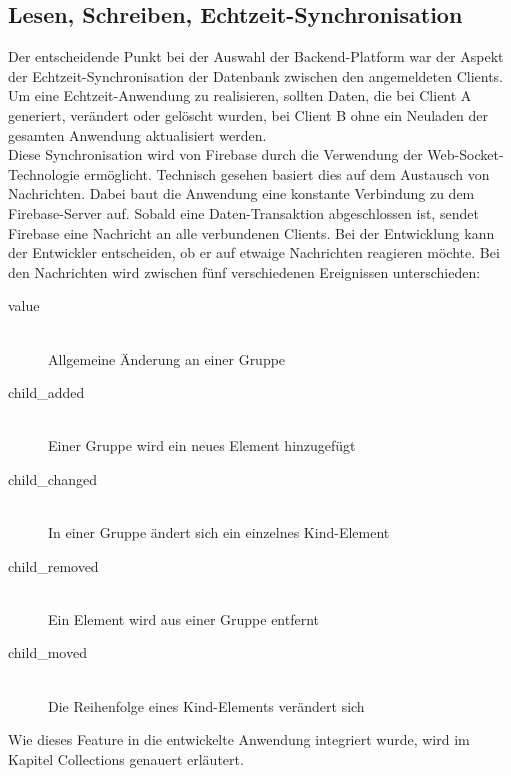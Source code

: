 \subsection{Lesen, Schreiben, Echtzeit-Synchronisation}
Der entscheidende Punkt bei der Auswahl der Backend-Platform war der Aspekt der Echtzeit-Synchronisation der Datenbank zwischen den angemeldeten Clients.
Um eine Echtzeit-Anwendung zu realisieren, sollten Daten, die bei Client A generiert, verändert oder gelöscht wurden, bei Client B ohne ein Neuladen der gesamten Anwendung aktualisiert werden.\\
Diese Synchronisation wird von Firebase durch die Verwendung der Web-Socket-Technologie ermöglicht. Technisch gesehen basiert dies auf dem Austausch von Nachrichten. Dabei baut die Anwendung eine konstante Verbindung
zu dem Firebase-Server auf. Sobald eine Daten-Transaktion abgeschlossen ist, sendet Firebase eine Nachricht an alle verbundenen Clients. Bei der Entwicklung kann der Entwickler entscheiden, ob er auf etwaige Nachrichten reagieren möchte.
Bei den Nachrichten wird zwischen fünf verschiedenen Ereignissen unterschieden:

\begin{description}
\item[value]\hfill \\
Allgemeine Änderung an einer Gruppe
\item[child\_added]\hfill \\ 
Einer Gruppe wird ein neues Element hinzugefügt
\item[child\_changed]\hfill \\ 
In einer Gruppe ändert sich ein einzelnes Kind-Element
\item[child\_removed]\hfill \\ 
Ein Element wird aus einer Gruppe entfernt
\item[child\_moved]\hfill \\ 
Die Reihenfolge eines Kind-Elements verändert sich
\end{description}


Wie dieses Feature in die entwickelte Anwendung integriert wurde, wird im Kapitel Collections genauert erläutert.

